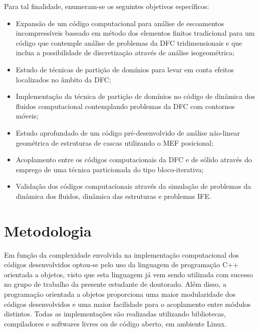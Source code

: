 \documentclass[tese_patricia.tex]{subfiles}
\begin{document}
Para tal finalidade, enumeram-se os seguintes objetivos específicos:

\begin{itemize}
	\item Expansão de um código computacional para análise de escoamentos incompressíveis baseado em método dos elementos finitos tradicional para um código que contemple análise de problemas da DFC tridimensionais e que inclua a possibilidade de discretização através de análise isogeométrica;
	
	\item Estudo de técnicas de partição de domínios para levar em conta efeitos localizados no âmbito da DFC;
	
	\item Implementação da técnica de partição de domínios no código de dinâmica dos fluidos computacional contemplando problemas da DFC com contornos móveis;
	
	\item Estudo aprofundado de um código pré-desenvolvido de análise não-linear geométrica de estruturas de cascas utilizando o MEF posicional;
	
	\item Acoplamento entre os códigos computacionais da DFC e de sólido através do emprego de uma técnica particionada do tipo bloco-iterativa;
	
	\item  Validação dos códigos computacionais através da simulação de problemas da dinâmica dos fluidos, dinâmica das estruturas e problemas IFE.
	
\end{itemize}

\section[Metodologia]{Metodologia} 

Em função da complexidade envolvida na implementação computacional dos códigos desenvolvidos optou-se pelo uso da linguagem de programação C++ orientada a objetos, visto que esta linguagem já vem sendo utilizada com sucesso no grupo de trabalho da presente estudante de doutorado. Além disso, a programação orientada a objetos proporciona uma maior modularidade dos códigos desenvolvidos e uma maior facilidade para o acoplamento entre módulos distintos.  Todas as implementações são realizadas utilizando bibliotecas, compiladores e softwares livres ou de código aberto, em ambiente Linux.
\end{document}
